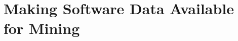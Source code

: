 \documentclass[aspectratio=169,xcolor=table]{beamer}
\begin{document}




    \section{Making Software Data Available for Mining}
\end{document}
